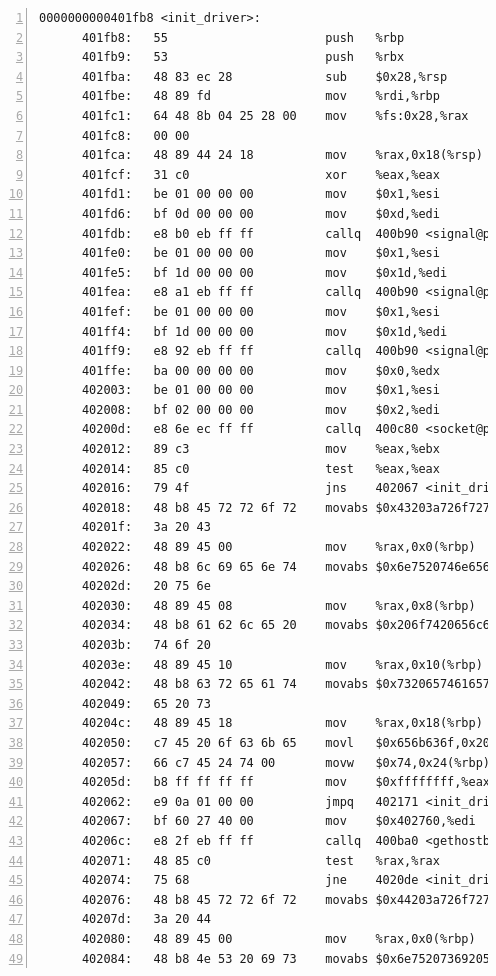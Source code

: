 \documentclass{article}
\begin{document}
\begin{lstlisting}[title = bomb的反汇编代码及部分注释, xleftmargin = 2em,xrightmargin = 2em, aboveskip = 1em, numbers = left, basicstyle=\scriptsize\ttfamily, numberstyle=\scriptsize]
    0000000000401fb8 <init_driver>:
      401fb8:	55                   	push   %rbp
      401fb9:	53                   	push   %rbx
      401fba:	48 83 ec 28          	sub    $0x28,%rsp
      401fbe:	48 89 fd             	mov    %rdi,%rbp
      401fc1:	64 48 8b 04 25 28 00 	mov    %fs:0x28,%rax
      401fc8:	00 00 
      401fca:	48 89 44 24 18       	mov    %rax,0x18(%rsp)
      401fcf:	31 c0                	xor    %eax,%eax
      401fd1:	be 01 00 00 00       	mov    $0x1,%esi
      401fd6:	bf 0d 00 00 00       	mov    $0xd,%edi
      401fdb:	e8 b0 eb ff ff       	callq  400b90 <signal@plt>
      401fe0:	be 01 00 00 00       	mov    $0x1,%esi
      401fe5:	bf 1d 00 00 00       	mov    $0x1d,%edi
      401fea:	e8 a1 eb ff ff       	callq  400b90 <signal@plt>
      401fef:	be 01 00 00 00       	mov    $0x1,%esi
      401ff4:	bf 1d 00 00 00       	mov    $0x1d,%edi
      401ff9:	e8 92 eb ff ff       	callq  400b90 <signal@plt>
      401ffe:	ba 00 00 00 00       	mov    $0x0,%edx
      402003:	be 01 00 00 00       	mov    $0x1,%esi
      402008:	bf 02 00 00 00       	mov    $0x2,%edi
      40200d:	e8 6e ec ff ff       	callq  400c80 <socket@plt>
      402012:	89 c3                	mov    %eax,%ebx
      402014:	85 c0                	test   %eax,%eax
      402016:	79 4f                	jns    402067 <init_driver+0xaf>
      402018:	48 b8 45 72 72 6f 72 	movabs $0x43203a726f727245,%rax
      40201f:	3a 20 43 
      402022:	48 89 45 00          	mov    %rax,0x0(%rbp)
      402026:	48 b8 6c 69 65 6e 74 	movabs $0x6e7520746e65696c,%rax
      40202d:	20 75 6e 
      402030:	48 89 45 08          	mov    %rax,0x8(%rbp)
      402034:	48 b8 61 62 6c 65 20 	movabs $0x206f7420656c6261,%rax
      40203b:	74 6f 20 
      40203e:	48 89 45 10          	mov    %rax,0x10(%rbp)
      402042:	48 b8 63 72 65 61 74 	movabs $0x7320657461657263,%rax
      402049:	65 20 73 
      40204c:	48 89 45 18          	mov    %rax,0x18(%rbp)
      402050:	c7 45 20 6f 63 6b 65 	movl   $0x656b636f,0x20(%rbp)
      402057:	66 c7 45 24 74 00    	movw   $0x74,0x24(%rbp)
      40205d:	b8 ff ff ff ff       	mov    $0xffffffff,%eax
      402062:	e9 0a 01 00 00       	jmpq   402171 <init_driver+0x1b9>
      402067:	bf 60 27 40 00       	mov    $0x402760,%edi
      40206c:	e8 2f eb ff ff       	callq  400ba0 <gethostbyname@plt>
      402071:	48 85 c0             	test   %rax,%rax
      402074:	75 68                	jne    4020de <init_driver+0x126>
      402076:	48 b8 45 72 72 6f 72 	movabs $0x44203a726f727245,%rax
      40207d:	3a 20 44 
      402080:	48 89 45 00          	mov    %rax,0x0(%rbp)
      402084:	48 b8 4e 53 20 69 73 	movabs $0x6e7520736920534e,%rax

\end{lstlisting}
\end{document}
